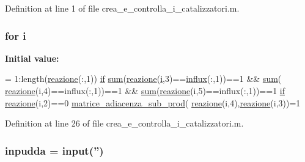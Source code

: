 Definition at line 1 of file crea\+\_\+e\+\_\+controlla\+\_\+i\+\_\+catalizzatori.\+m.

\hypertarget{a00104_a6f6ccfcf58b31cb6412107d9d5281426}{
\subsubsection[{i}]{\setlength{\rightskip}{0pt plus 5cm}for i}}\label{a00104_a6f6ccfcf58b31cb6412107d9d5281426}
{\bfseries Initial value\+:}
\begin{DoxyCode}
= 1:length(\hyperlink{a00102_a84d78e886b9f683403579e3911e7f046}{reazione}(:,1))
                \hyperlink{a00025_adf3394dfd4755fd0ef2854fe558ff8aa}{if} \hyperlink{a00028_a576bebae86b11914280920c448def53d}{sum}(\hyperlink{a00102_a84d78e886b9f683403579e3911e7f046}{reazione}(\hyperlink{a00104_a6f6ccfcf58b31cb6412107d9d5281426}{i},3)==\hyperlink{a00028_a637d2af7e7b03600bcaf1931b999e3fc}{influx}(:,1))==1 && \hyperlink{a00028_a576bebae86b11914280920c448def53d}{sum}(
      \hyperlink{a00102_a84d78e886b9f683403579e3911e7f046}{reazione}(i,4)==influx(:,1))==1 && \hyperlink{a00028_a576bebae86b11914280920c448def53d}{sum}(\hyperlink{a00102_a84d78e886b9f683403579e3911e7f046}{reazione}(i,5)==influx(:,1))==1
                    \hyperlink{a00025_adf3394dfd4755fd0ef2854fe558ff8aa}{if} \hyperlink{a00102_a84d78e886b9f683403579e3911e7f046}{reazione}(i,2)==0                        
                        \hyperlink{a00104_a75ff61c394ad5be40e5084b8b794e2b2}{matrice\_adiacenza\_sub\_prod}(
      \hyperlink{a00102_a84d78e886b9f683403579e3911e7f046}{reazione}(i,4),\hyperlink{a00102_a84d78e886b9f683403579e3911e7f046}{reazione}(i,3))=1
\end{DoxyCode}


Definition at line 26 of file crea\+\_\+e\+\_\+controlla\+\_\+i\+\_\+catalizzatori.\+m.

\hypertarget{a00104_a89b9ef94bb4f5e3a4eec1cd4dc807e19}{
\subsubsection[{inpudda}]{\setlength{\rightskip}{0pt plus 5cm}inpudda = input('')}}\label{a00104_a89b9ef94bb4f5e3a4eec1cd4dc807e19}


